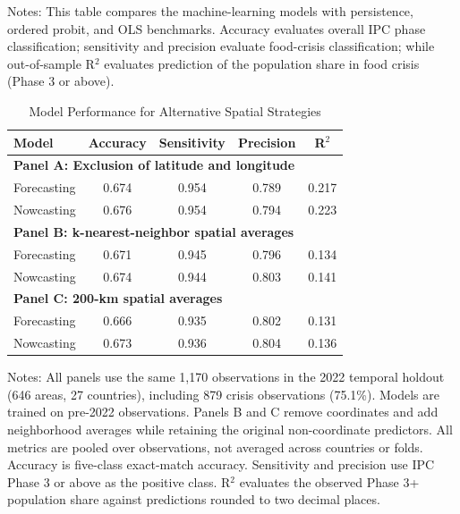 \documentclass[pdflatex,sn-mathphys-num]{sn-jnl}%
\theoremstyle{thmstyleone}%
\theoremstyle{thmstyletwo}%
\theoremstyle{thmstylethree}%
\begin{document}
Notes: This table compares the machine-learning models with persistence, ordered probit, and OLS benchmarks. Accuracy evaluates overall IPC phase classification; sensitivity and precision evaluate food-crisis classification; while out-of-sample R$^2$ evaluates prediction of the population share in food crisis (Phase 3 or above).

\newpage
\clearpage
\begin{table}
\centering
\caption{Model Performance for Alternative Spatial Strategies}
\label{tab:spatial strategy}
\begin{tabular}{lcccc}     \toprule
\textbf{Model} & \textbf{Accuracy} & \textbf{Sensitivity} & \textbf{Precision} & \textbf{R$^2$} \\ \midrule
\multicolumn{5}{l}{\textbf{Panel A: Exclusion of latitude and longitude}} \\
Forecasting & 0.674 & 0.954 & 0.789 & 0.217 \\
Nowcasting & 0.676 & 0.954 & 0.794 & 0.223 \\
\multicolumn{5}{l}{\textbf{Panel B: k-nearest-neighbor spatial averages}} \\
Forecasting & 0.671 & 0.945 & 0.796 & 0.134 \\
Nowcasting & 0.674 & 0.944 & 0.803 & 0.141 \\
\multicolumn{5}{l}{\textbf{Panel C: 200-km spatial averages}} \\
Forecasting & 0.666 & 0.935 & 0.802 & 0.131 \\
Nowcasting & 0.673 & 0.936 & 0.804 & 0.136 \\
\bottomrule
\end{tabular}
Notes: All panels use the same 1,170 observations in the 2022 temporal holdout (646 areas, 27 countries), including 879 crisis observations (75.1\%). Models are trained on pre-2022 observations. Panels B and C remove coordinates and add neighborhood averages while retaining the original non-coordinate predictors. All metrics are pooled over observations, not averaged across countries or folds. Accuracy is five-class exact-match accuracy. Sensitivity and precision use IPC Phase 3 or above as the positive class. R$^2$ evaluates the observed Phase 3+ population share against predictions rounded to two decimal places.
\end{table}
\end{document}

